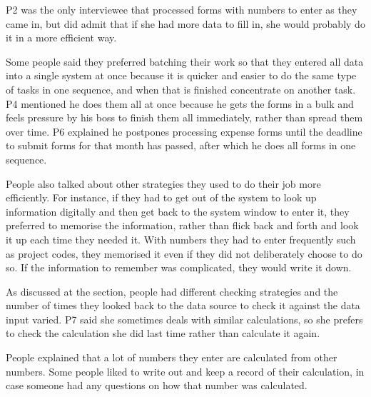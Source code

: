 P2 was the only interviewee that processed forms with numbers to enter as they came in, but did admit that if she had more data to fill in, she would probably do it in a more efficient way.

Some people said they preferred batching their work so that they entered all data into a single system at once because it is quicker and easier to do the same type of tasks in one sequence, and when that is finished concentrate on another task. P4 mentioned he does them all at once because he gets the forms in a bulk and feels pressure by his boss to finish them all immediately, rather than spread them over time. P6 explained he postpones processing expense forms until the deadline to submit forms for that month has passed, after which he does all forms in one sequence. 

People also talked about other strategies they used to do their job more efficiently. For instance, if they had to get out of the system to look up information digitally and then get back to the system window to enter it, they preferred to memorise the information, rather than flick back and forth and look it up each time they needed it. With numbers they had to enter frequently such as project codes, they memorised it even if they did not deliberately choose to do so. If the information to remember was complicated, they would write it down.

As discussed at the  section, people had different checking strategies and the number of times they looked back to the data source to check it against the data input varied. P7 said she sometimes deals with similar calculations, so she prefers to check the calculation she did last time rather than calculate it again. 

People explained that a lot of numbers they enter are calculated from other numbers. Some people liked to write out and keep a record of their calculation, in case someone had any questions on how that number was calculated.

